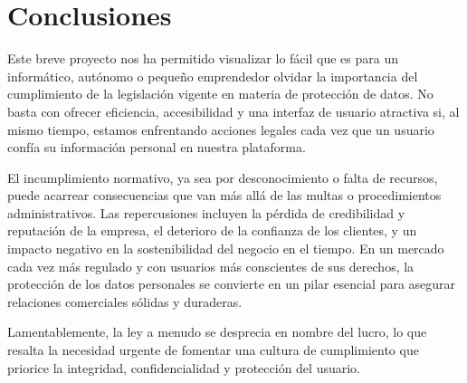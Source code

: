 \part{Conclusiones}
Este breve proyecto nos ha permitido visualizar lo fácil que es para un informático, autónomo o pequeño emprendedor olvidar la importancia del cumplimiento de la legislación vigente en materia de protección de datos. No basta con ofrecer eficiencia, accesibilidad y una interfaz de usuario atractiva si, al mismo tiempo, estamos enfrentando acciones legales cada vez que un usuario confía su información personal en nuestra plataforma.

El incumplimiento normativo, ya sea por desconocimiento o falta de recursos, puede acarrear consecuencias que van más allá de las multas o procedimientos administrativos. Las repercusiones incluyen la pérdida de credibilidad y reputación de la empresa, el deterioro de la confianza de los clientes, y un impacto negativo en la sostenibilidad del negocio en el tiempo. En un mercado cada vez más regulado y con usuarios más conscientes de sus derechos, la protección de los datos personales se convierte en un pilar esencial para asegurar relaciones comerciales sólidas y duraderas.

Lamentablemente, la ley a menudo se desprecia en nombre del lucro, lo que resalta la necesidad urgente de fomentar una cultura de cumplimiento que priorice la integridad, confidencialidad y protección del usuario.